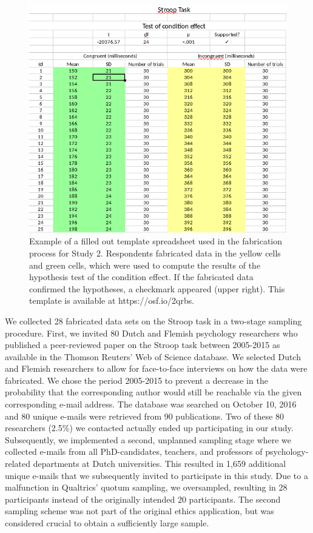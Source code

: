 \documentclass[a5paper]{book}
\begin{document}
\begin{figure}
\includegraphics[width=1\linewidth]{./assets/figures/spreadsheet2} \caption{Example of a filled out template spreadsheet used in the fabrication process for Study 2. Respondents fabricated data in the yellow cells and green cells, which were used to compute the results of the hypothesis test of the condition effect. If the fabricated data confirmed the hypotheses, a checkmark appeared (upper right). This template is available at https://osf.io/2qrbs.}\label{fig:spreadsheet-study2}
\end{figure}

We collected 28 fabricated data sets on the Stroop task in a two-stage
sampling procedure. First, we invited 80 Dutch and Flemish psychology
researchers who published a peer-reviewed paper on the Stroop task
between 2005-2015 as available in the Thomson Reuters' Web of Science
database. We selected Dutch and Flemish researchers to allow for
face-to-face interviews on how the data were fabricated. We chose the
period 2005-2015 to prevent a decrease in the probability that the
corresponding author would still be reachable via the given
corresponding e-mail address. The database was searched on October 10,
2016 and 80 unique e-mails were retrieved from 90 publications. Two of
these 80 researchers (2.5\%) we contacted actually ended up
participating in our study. Subsequently, we implemented a second,
unplanned sampling stage where we collected e-mails from all
PhD-candidates, teachers, and professors of psychology-related
departments at Dutch universities. This resulted in 1,659 additional
unique e-mails that we subsequently invited to participate in this
study. Due to a malfunction in Qualtrics' quotum sampling, we
oversampled, resulting in 28 participants instead of the originally
intended 20 participants. The second sampling scheme was not part of the
original ethics application, but was considered crucial to obtain a
sufficiently large sample.
\end{document}
